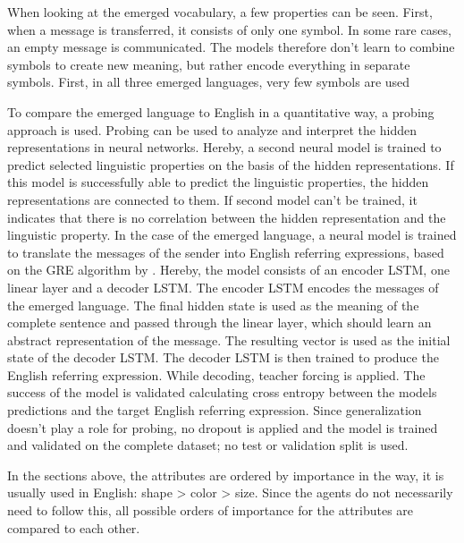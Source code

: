 When looking at the emerged vocabulary, a few properties can be seen.
First, when a message is transferred, it consists of only one symbol.
In some rare cases, an empty message is communicated.
The models therefore don't learn to combine symbols to create new meaning, but rather encode everything in separate symbols.
First, in all three emerged languages, very few symbols are used

To compare the emerged language to English in a quantitative way, a probing approach is used.
Probing can be used to analyze and interpret the hidden representations in neural networks.
Hereby, a second neural model is trained to predict selected linguistic properties on the basis of the hidden representations.
If this model is successfully able to predict the linguistic properties, the hidden representations are connected to them.
If second model can't be trained, it indicates that there is no correlation between the hidden representation and the linguistic property.
In the case of the emerged language, a neural model is trained to translate the messages of the sender into English referring expressions, based on the GRE algorithm by \citet{Dale1995}.
Hereby, the model consists of an encoder LSTM, one linear layer and a decoder LSTM.
The encoder LSTM encodes the messages of the emerged language.
The final hidden state is used as the meaning of the complete sentence and passed through the linear layer, which should learn an abstract representation of the message.
The resulting vector is used as the initial state of the decoder LSTM.
The decoder LSTM is then trained to produce the English referring expression.
While decoding, teacher forcing is applied.
The success of the model is validated calculating cross entropy between the models predictions and the target English referring expression.
Since generalization doesn't play a role for probing, no dropout is applied and the model is trained and validated on the complete dataset; no test or validation split is used.

In the sections above, the attributes are ordered by importance in the way, it is usually used in English: shape > color > size.
Since the agents do not necessarily need to follow this, all possible orders of importance for the attributes are compared to each other.

